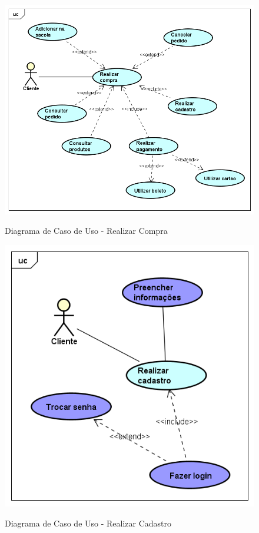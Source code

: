 \begin{figure}[H]
    \centering
    \caption{Diagrama de Caso de Uso -  Realizar Compra}
    \includegraphics[width=1.0\textwidth]{./dados/figuras/4_1}
    \label{fig:figura-1}
\end{figure}
\begin{figure}[H]
    \centering
    \caption{Diagrama de Caso de Uso - Realizar Cadastro}
    \includegraphics[width=1.0\textwidth]{./dados/figuras/3}
    \label{fig:figura-1}
\end{figure}
